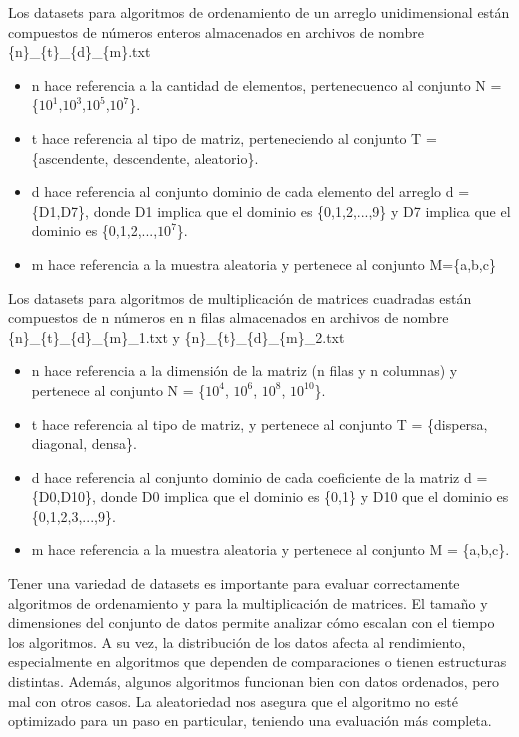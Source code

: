 Los datasets para algoritmos de ordenamiento de un arreglo unidimensional están compuestos de números enteros almacenados en archivos de nombre \{n\}\_\{t\}\_\{d\}\_\{m\}.txt\:
\begin{itemize}
    \item n hace referencia a la cantidad de elementos, pertenecuenco al conjunto N = \{$10^1$,$10^3$,$10^5$,$10^7$\}.
    \item t hace referencia al tipo de matriz, perteneciendo al conjunto T = \{ascendente, descendente, aleatorio\}.
    \item d hace referencia al conjunto dominio de cada elemento del arreglo d = \{D1,D7\}, donde D1 implica que el dominio es \{0,1,2,...,9\} y D7 implica que el dominio es \{0,1,2,...,$10^7$\}.
    \item m hace referencia a la muestra aleatoria y pertenece al conjunto M=\{a,b,c\}
\end{itemize}

Los datasets para algoritmos de multiplicación de matrices cuadradas están compuestos de n números en n filas almacenados en archivos de nombre \{n\}\_\{t\}\_\{d\}\_\{m\}\_1.txt y \{n\}\_\{t\}\_\{d\}\_\{m\}\_2.txt\:
\begin{itemize}
    \item n hace referencia a la dimensión de la matriz (n filas y n columnas) y pertenece al conjunto N = \{$10^4$, $10^6$, $10^8$, $10^{10}$\}.
    \item t hace referencia al tipo de matriz, y pertenece al conjunto T = \{dispersa, diagonal, densa\}. 
    \item d hace referencia al conjunto dominio de cada coeficiente de la matriz d = \{D0,D10\}, donde D0 implica que el dominio es \{0,1\} y D10 que el dominio es \{0,1,2,3,...,9\}.
    \item m hace referencia a la muestra aleatoria y pertenece al conjunto M = \{a,b,c\}.
\end{itemize}

Tener una variedad de datasets es importante para evaluar correctamente algoritmos de ordenamiento y para la multiplicación de matrices. El tamaño y dimensiones del conjunto de datos permite analizar cómo escalan con el tiempo los algoritmos. A su vez, la distribución de los datos afecta al rendimiento, especialmente en algoritmos que dependen de comparaciones o tienen estructuras distintas. Además, algunos algoritmos funcionan bien con datos ordenados, pero mal con otros casos. La aleatoriedad nos asegura que el algoritmo no esté optimizado para un paso en particular, teniendo una evaluación más completa.